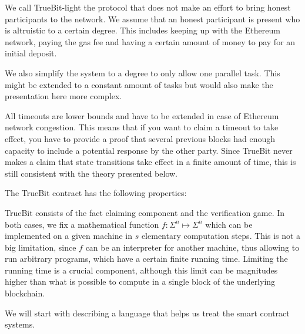\documentclass[11pt,letterpaper]{article}
\begin{document}
We call TrueBit-light the protocol that does not make an effort to bring honest participants to the network.
We assume that an honest participant is present who is altruistic to a certain degree. This includes keeping up
with the Ethereum network, paying the gas fee and having a certain amount of money to pay for an initial deposit.

We also simplify the system to a degree to only allow one parallel task. This might be extended to a constant amount
of tasks but would also make the presentation here more complex.

All timeouts are lower bounds and have to be extended in case of Ethereum network congestion. This means that if you want
to claim a timeout to take effect, you have to provide a proof that several previous blocks had enough capacity to
include a potential response by the other party. Since TrueBit never makes a claim that state transitions take effect
in a finite amount of time, this is still consistent with the theory presented below.

The TrueBit contract has the following properties:

TrueBit consists of the fact claiming component and the verification game. In both cases, we fix a mathematical function
$f \colon \Sigma^n \mapsto \Sigma^n$ which can be implemented on a given machine in $s$ elementary computation steps.
This is not a big limitation, since $f$ can be an interpreter for another machine, thus allowing to run arbitrary programs,
which have a certain finite running time. Limiting the running time is a crucial component, although this limit can be
magnitudes higher than what is possible to compute in a single block of the underlying blockchain.

We will start with describing a language that helps us treat the smart contract systems.
\end{document}
